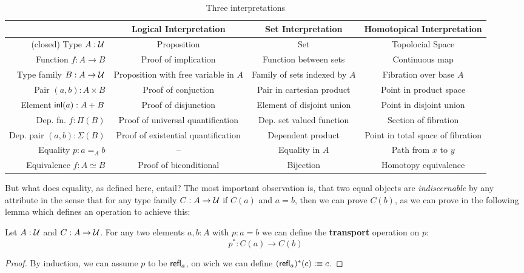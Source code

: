 \begin{sidewaystable}
{\small
\begin{tabular}{r|ccc}
  & Logical Interpretation & Set Interpretation & Homotopical Interpretation \\
\hline
(closed) Type $A : \mathcal{U}$
  & Proposition
  & Set
  & Topolocial Space \\
Function $f : A \to B$
  & Proof of implication
  & Function between sets
  & Continuous map \\
Type family $B : A \to \mathcal{U}$
  & Proposition with free variable in $A$
  & Family of sets indexed by $A$
  & Fibration over base $A$ \\
Pair $(a, b) : A \times B$
  & Proof of conjuction
  & Pair in cartesian product
  & Point in product space \\
Element $\mathsf{inl}(a) : A + B$
  & Proof of disjunction
  & Element of disjoint union
  & Point in disjoint union \\
Dep. fn. $f : \Pi(B)$
  & Proof of universal quantification
  & Dep. set valued function
  & Section of fibration \\
Dep. pair $(a, b) : \Sigma(B)$
  & Proof of existential quantification
  & Dependent product
  & Point in total space of fibration \\
Equality $p : a =_A b$
  & --
  & Equality in $A$
  & Path from $x$ to $y$ \\
Equivalence $f : A \simeq B$
  & Proof of biconditional
  & Bijection
  & Homotopy equivalence
\end{tabular}}
\caption{Three interpretations}\label{tbl:tt-hott}
\end{sidewaystable}

But what does equality, as defined here, entail?
The most important observation is, that two equal objects are \emph{indiscernable}
by any attribute in the sense that for any type family $C : A \to \mathcal{U}$ if
$C(a)$ and $a = b$, then we can prove $C(b)$, as we can prove in the following
lemma which defines an operation to achieve this:
\begin{lemma}[Transport]
Let $A : \mathcal{U}$ and $C : A \to \mathcal{U}$.
For any two elements $a, b : A$ with $p : a = b$ we can define the
\textbf{transport} operation on $p$:
\begin{equation*}
p^* : C(a) \to C(b)
\end{equation*}
\end{lemma}

\begin{proof}
By induction, we can assume $p$ to be $\mathsf{refl}_a$, on wich we can define
$(\mathsf{refl}_a)^*(c) :\equiv c$.
\end{proof}

